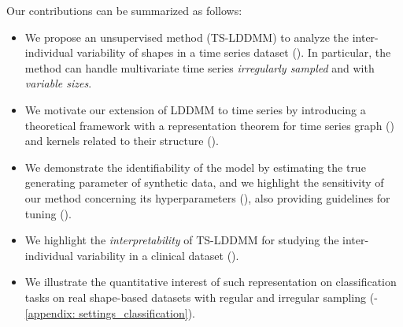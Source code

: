     Our contributions can be summarized as follows:
    \begin{itemize}
       \item We propose an unsupervised method (TS-LDDMM) to analyze the inter-individual variability of shapes in a time series dataset (). In particular, the method can handle multivariate time series \textit{irregularly sampled} and with \textit{variable sizes}.
       \item We motivate our extension of LDDMM to time series by introducing a theoretical framework with a representation theorem for time series graph () and kernels related to their structure ().
       \item We demonstrate the identifiability of the model by estimating the true generating parameter of synthetic data, and we highlight the sensitivity of our method concerning its hyperparameters (), also providing guidelines for tuning ().
       \item We highlight the \textit{interpretability} of TS-LDDMM for studying the inter-individual variability in a clinical dataset ().
        \item We illustrate the quantitative interest of such representation on classification tasks on real shape-based datasets with regular and irregular sampling (-\ref{appendix: settings_classification}).
 \end{itemize}

      

